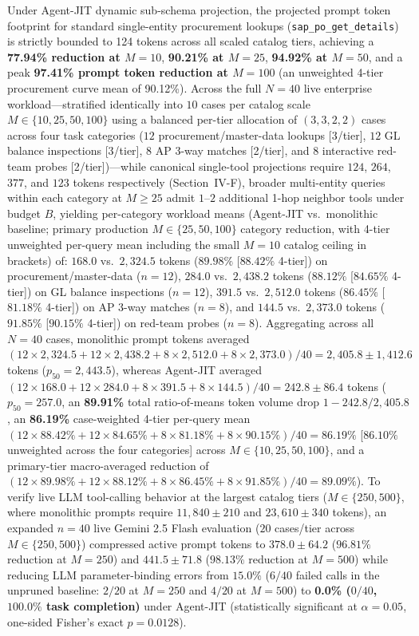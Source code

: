 \documentclass[conference,10pt]{IEEEtran}
\begin{document}
Under Agent-JIT dynamic sub-schema projection, the projected prompt token footprint for standard single-entity procurement lookups (\texttt{sap\_po\_get\_details}) is strictly bounded to 124 tokens across all scaled catalog tiers, achieving a \textbf{77.94\% reduction at $M=10$}, \textbf{90.21\% at $M=25$}, \textbf{94.92\% at $M=50$}, and a peak \textbf{97.41\% prompt token reduction at $M=100$} (an unweighted 4-tier procurement curve mean of 90.12\%). Across the full $N = 40$ live enterprise workload—stratified identically into $10$ cases per catalog scale $M \in \{10, 25, 50, 100\}$ using a balanced per-tier allocation of $(3, 3, 2, 2)$ cases across four task categories ($12$ procurement/master-data lookups [3/tier], $12$ GL balance inspections [3/tier], $8$ AP 3-way matches [2/tier], and $8$ interactive red-team probes [2/tier])—while canonical single-tool projections require $124$, $264$, $377$, and $123$ tokens respectively (Section~IV-F), broader multi-entity queries within each category at $M \ge 25$ admit $1$--$2$ additional 1-hop neighbor tools under budget $B$, yielding per-category workload means (Agent-JIT vs.\ monolithic baseline; primary production $M \in \{25, 50, 100\}$ category reduction, with 4-tier unweighted per-query mean including the small $M=10$ catalog ceiling in brackets) of: $168.0$ vs.\ $2{,}324.5$ tokens ($89.98\%$ [$88.42\%$ 4-tier]) on procurement/master-data ($n=12$), $284.0$ vs.\ $2{,}438.2$ tokens ($88.12\%$ [$84.65\%$ 4-tier]) on GL balance inspections ($n=12$), $391.5$ vs.\ $2{,}512.0$ tokens ($86.45\%$ [$81.18\%$ 4-tier]) on AP 3-way matches ($n=8$), and $144.5$ vs.\ $2{,}373.0$ tokens ($91.85\%$ [$90.15\%$ 4-tier]) on red-team probes ($n=8$). Aggregating across all $N=40$ cases, monolithic prompt tokens averaged $(12 \times 2{,}324.5 + 12 \times 2{,}438.2 + 8 \times 2{,}512.0 + 8 \times 2{,}373.0)/40 = 2{,}405.8 \pm 1{,}412.6$ tokens ($p_{50} = 2{,}443.5$), whereas Agent-JIT averaged $(12 \times 168.0 + 12 \times 284.0 + 8 \times 391.5 + 8 \times 144.5)/40 = 242.8 \pm 86.4$ tokens ($p_{50} = 257.0$, an \textbf{89.91\%} total ratio-of-means token volume drop $1 - 242.8/2{,}405.8$, an \textbf{86.19\%} case-weighted 4-tier per-query mean $(12 \times 88.42\% + 12 \times 84.65\% + 8 \times 81.18\% + 8 \times 90.15\%)/40 = 86.19\%$ [$86.10\%$ unweighted across the four categories] across $M \in \{10, 25, 50, 100\}$, and a primary-tier macro-averaged reduction of $(12 \times 89.98\% + 12 \times 88.12\% + 8 \times 86.45\% + 8 \times 91.85\%)/40 = \mathbf{89.09\%}$). To verify live LLM tool-calling behavior at the largest catalog tiers ($M \in \{250, 500\}$, where monolithic prompts require $11{,}840 \pm 210$ and $23{,}610 \pm 340$ tokens), an expanded $n = 40$ live Gemini 2.5 Flash evaluation ($20$ cases/tier across $M \in \{250, 500\}$) compressed active prompt tokens to $378.0 \pm 64.2$ ($96.81\%$ reduction at $M=250$) and $441.5 \pm 71.8$ ($98.13\%$ reduction at $M=500$) while reducing LLM parameter-binding errors from $15.0\%$ ($6/40$ failed calls in the unpruned baseline: $2/20$ at $M=250$ and $4/20$ at $M=500$) to \textbf{0.0\% ($0/40$, $100.0\%$ task completion)} under Agent-JIT (statistically significant at $\alpha = 0.05$, one-sided Fisher's exact $p = 0.0128$).
\end{document}
